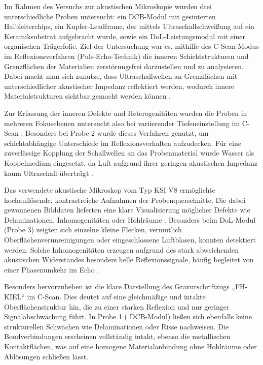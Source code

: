 Im Rahmen des Versuchs zur akustischen Mikroskopie wurden drei unterschiedliche Proben untersucht: ein DCB-Modul mit gesinterten Halbleiterchips, ein Kupfer-Leadframe, der mittels Ultraschallschweißung auf ein Keramiksubstrat aufgebracht wurde, sowie ein DoL-Leistungsmodul mit einer organischen Trägerfolie. Ziel der Untersuchung war es, mithilfe des C-Scan-Modus im Reflexionsverfahren (Puls-Echo-Technik) die inneren Schichtstrukturen und Grenzflächen der Materialien zerstörungsfrei darzustellen und zu analysieren. Dabei macht man sich zunutze, dass Ultraschallwellen an Grenzflächen mit unterschiedlicher akustischer Impedanz reflektiert werden, wodurch innere Materialstrukturen sichtbar gemacht werden können \cite{pvateplaSAM, wikiSAM2024}.

Zur Erfassung der inneren Defekte und Heterogenitäten wurden die Proben in mehreren Fokusebenen untersucht also bei variierender Tiefeneinstellung im C-Scan \cite{hennig2025}. Besonders bei Probe 2 wurde dieses Verfahren genutzt, um schichtabhängige Unterschiede im Reflexionsverhalten aufzudecken. Für eine zuverlässige Kopplung der Schallwellen an das Probenmaterial wurde Wasser als Koppelmedium eingesetzt, da Luft aufgrund ihrer geringen akustischen Impedanz kaum Ultraschall überträgt \cite{pvateplaSAM}.

Das verwendete akustische Mikroskop vom Typ KSI V8 ermöglichte hochauflösende, kontrastreiche Aufnahmen der Probenquerschnitte. Die dabei gewonnenen Bilddaten lieferten eine klare Visualisierung möglicher Defekte wie Delaminationen, Inhomogenitäten oder Hohlräume \cite{hennig2025}. Besonders beim DoL-Modul (Probe 3) zeigten sich einzelne kleine Flecken, vermutlich Oberflächenverunreinigungen oder eingeschlossene Luftblasen, konnten detektiert werden. Solche Inhomogenitäten erzeugen aufgrund des stark abweichenden akustischen Widerstandes besonders helle Reflexionssignale, häufig begleitet von einer Phasenumkehr im Echo \cite{wikiSAM2024}.

Besonders hervorzuheben ist die klare Darstellung des Gravurschriftzugs „FH-KIEL“ im C-Scan. Dies deutet auf eine gleichmäßige und intakte Oberflächenstruktur hin, die zu einer starken Reflexion und nur geringer Signalabschwächung führt. In Probe 1 ( DCB-Modul) ließen sich ebenfalls keine strukturellen Schwächen wie Delaminationen oder Risse nachweisen. Die Bondverbindungen erscheinen vollständig intakt, ebenso die metallischen Kontaktflächen, was auf eine homogene Materialanbindung ohne Hohlräume oder Ablösungen schließen lässt.

